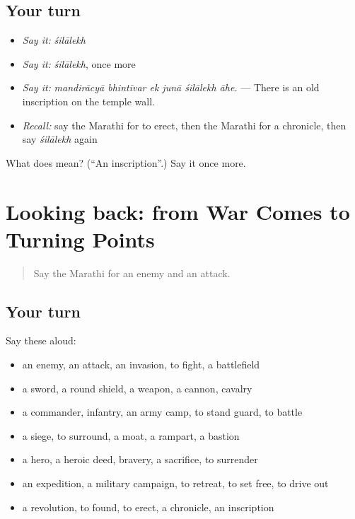 \subsection*{Your turn}
\begin{itemize}
\raggedright
  \item \emph{Say it:} \emph{śilālekh}
  \item \emph{Say it:} \emph{śilālekh}, once more
  \item \emph{Say it:} \emph{mandirācyā bhintīvar ek junā śilālekh āhe.} — There is an old inscription on the temple wall.
  \item \emph{Recall:} say the Marathi for to erect, then the Marathi for a chronicle, then say \emph{śilālekh} again
\end{itemize}

\begin{tcolorbox}[breakable,colback=teal!4,colframe=teal!35!black,title={Before you move on}]
What does  mean? (\textquotedblleft{}An inscription\textquotedblright{}.) Say it once more.
\end{tcolorbox}
\section[(dialogue)]{Looking back: from War Comes to Turning Points}

\label{lesson:MR-R334-review-328-334}



\begin{quote}
Say the Marathi for an enemy and an attack.
\end{quote}

\subsection*{Your turn}
Say these aloud:

\begin{itemize}
\raggedright
  \item an enemy, an attack, an invasion, to fight, a battlefield
  \item a sword, a round shield, a weapon, a cannon, cavalry
  \item a commander, infantry, an army camp, to stand guard, to battle
  \item a siege, to surround, a moat, a rampart, a bastion
  \item a hero, a heroic deed, bravery, a sacrifice, to surrender
  \item an expedition, a military campaign, to retreat, to set free, to drive out
  \item a revolution, to found, to erect, a chronicle, an inscription
\end{itemize}

